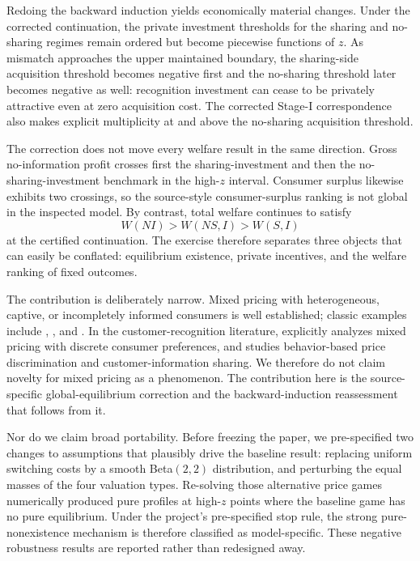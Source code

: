 Redoing the backward induction yields economically material changes. Under the corrected continuation, the private investment thresholds for the sharing and no-sharing regimes remain ordered but become piecewise functions of \(z\). As mismatch approaches the upper maintained boundary, the sharing-side acquisition threshold becomes negative first and the no-sharing threshold later becomes negative as well: recognition investment can cease to be privately attractive even at zero acquisition cost. The corrected Stage-I correspondence also makes explicit multiplicity at and above the no-sharing acquisition threshold.

The correction does not move every welfare result in the same direction. Gross no-information profit crosses first the sharing-investment and then the no-sharing-investment benchmark in the high-\(z\) interval. Consumer surplus likewise exhibits two crossings, so the source-style consumer-surplus ranking is not global in the inspected model. By contrast, total welfare continues to satisfy
\[
 W(NI)>W(NS,I)>W(S,I)
\]
at the certified continuation. The exercise therefore separates three objects that can easily be conflated: equilibrium existence, private incentives, and the welfare ranking of fixed outcomes.

The contribution is deliberately narrow. Mixed pricing with heterogeneous, captive, or incompletely informed consumers is well established; classic examples include \citet{Shilony1977}, \citet{Varian1980}, and \citet{Narasimhan1988}. In the customer-recognition literature, \citet{Esteves2010} explicitly analyzes mixed pricing with discrete consumer preferences, and \citet{deNijs2017} studies behavior-based price discrimination and customer-information sharing. We therefore do not claim novelty for mixed pricing as a phenomenon. The contribution here is the source-specific global-equilibrium correction and the backward-induction reassessment that follows from it.

Nor do we claim broad portability. Before freezing the paper, we pre-specified two changes to assumptions that plausibly drive the baseline result: replacing uniform switching costs by a smooth Beta\((2,2)\) distribution, and perturbing the equal masses of the four valuation types. Re-solving those alternative price games numerically produced pure profiles at high-\(z\) points where the baseline game has no pure equilibrium. Under the project's pre-specified stop rule, the strong pure-nonexistence mechanism is therefore classified as model-specific. These negative robustness results are reported rather than redesigned away.

